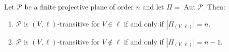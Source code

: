 Let $\mathcal{P}$ be a finite projective plane of order $n$ and let $\Pi = \operatorname{Aut}\mathcal{P}$. Then:
\begin{enumerate}
\item[(i)] $\mathcal{P}$ is $(V,\ell)$-transitive for $V \in \ell$ if and only if $|\Pi_{(V,\ell)}| = n$.
\item[(ii)] $\mathcal{P}$ is $(V,\ell)$-transitive for $V \notin \ell$ if and only if $|\Pi_{(V,\ell)}| = n-1$.
\end{enumerate}
